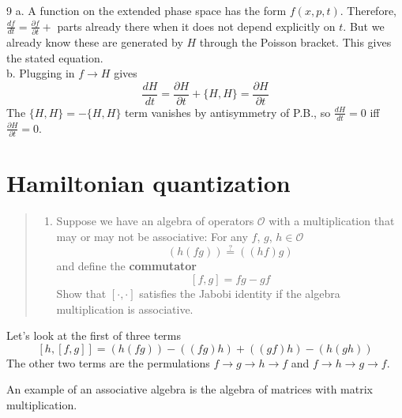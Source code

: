 \documentclass[
  letterpaper,
  DIV=11,
  numbers=noendperiod]{scrartcl}
\providecommand{\tightlist}{%
  \setlength{\itemsep}{0pt}\setlength{\parskip}{0pt}}
\begin{document}
9 a. A function on the extended phase space has the form \(f(x, p, t)\).
Therefore, \(\frac {df}{dt} = \frac {\partial f}{\partial t}+\) parts
already there when it does not depend explicitly on \(t\). But we
already know these are generated by \(H\) through the Poisson bracket.
This gives the stated equation.\\
b. Plugging in \(f\to H\) gives \[
\frac {dH}{dt} = \frac {\partial H}{\partial t} + \{H,H\}
= \frac {\partial H}{\partial t}
\] The \(\{H, H\}=-\{H, H\}\) term vanishes by antisymmetry of P.B., so
\(\frac {dH}{dt}=0\) iff \(\frac {\partial H}{\partial t}=0\).

\section{Hamiltonian quantization}\label{hamiltonian-quantization}

\begin{quote}
\begin{enumerate}
\def\labelenumi{\arabic{enumi}.}
\setcounter{enumi}{10}
\tightlist
\item
  Suppose we have an algebra of operators \(\mathscr O\) with a
  multiplication that may or may not be associative: For any \(f\),
  \(g\), \(h\in \mathscr O\) \[
  (h(fg)) \stackrel?= ((hf)g)
  \] and define the \textbf{commutator} \[
  [f,g] = fg - gf
  \] Show that \([\cdot, \cdot]\) satisfies the Jabobi identity if the
  algebra multiplication is associative.
\end{enumerate}
\end{quote}

Let's look at the first of three terms \[
[h,[f,g]]=(h(fg)) - ((fg)h) + ((gf)h) - (h(gh))
\] The other two terms are the permulations \(f\to g\to h\to f\) and
\(f\to h\to g\to f\).

An example of an associative algebra is the algebra of matrices with
matrix multiplication.
\end{document}
